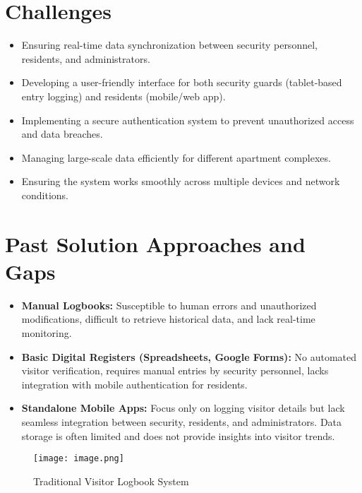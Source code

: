 \documentclass[sigconf]{acmart}
\begin{document}
\section{Challenges}
\begin{itemize}
    \item Ensuring real-time data synchronization between security personnel, residents, and administrators.
    \item Developing a user-friendly interface for both security guards (tablet-based entry logging) and residents (mobile/web app).
    \item Implementing a secure authentication system to prevent unauthorized access and data breaches.
    \item Managing large-scale data efficiently for different apartment complexes.
    \item Ensuring the system works smoothly across multiple devices and network conditions.
\end{itemize}

\section{Past Solution Approaches and Gaps}
\begin{itemize}
    \item \textbf{Manual Logbooks:} Susceptible to human errors and unauthorized modifications, difficult to retrieve historical data, and lack real-time monitoring.
    \item \textbf{Basic Digital Registers (Spreadsheets, Google Forms):} No automated visitor verification, requires manual entries by security personnel, lacks integration with mobile authentication for residents.
    \item \textbf{Standalone Mobile Apps:} Focus only on logging visitor details but lack seamless integration between security, residents, and administrators. Data storage is often limited and does not provide insights into visitor trends.
\end{itemize}

\begin{figure}[h]
\centering
\texttt{[image: image.png]}
\caption{Traditional Visitor Logbook System}
\label{fig:logbook}
\end{figure}
\end{document}
